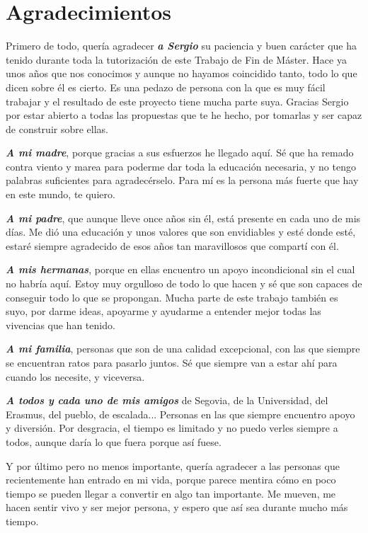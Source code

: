 \cleardoublepage
{}
\chapter*{Agradecimientos}

Primero de todo, quería agradecer \textbf{\textit{a Sergio}} su paciencia y buen carácter que ha tenido durante toda la tutorización de este Trabajo de Fin de Máster. Hace ya unos años que nos conocimos y aunque no hayamos coincidido tanto, todo lo que dicen sobre él es cierto. Es una pedazo de persona con la que es muy fácil trabajar y el resultado de este proyecto tiene mucha parte suya. Gracias Sergio por estar abierto a todas las propuestas que te he hecho, por tomarlas y ser capaz de construir sobre ellas.

\textbf{\textit{A mi madre}}, porque gracias a sus esfuerzos he llegado aquí. Sé que ha remado contra viento y marea para poderme dar toda la educación necesaria, y no tengo palabras suficientes para agradecérselo. Para mí es la persona más fuerte que hay en este mundo, te quiero.

\textbf{\textit{A mi padre}}, que aunque lleve once años sin él, está presente en cada uno de mis días. Me dió una educación y unos valores que son envidiables y esté donde esté, estaré siempre agradecido de esos años tan maravillosos que compartí con él.

\textbf{\textit{A mis hermanas}}, porque en ellas encuentro un apoyo incondicional sin el cual no habría aquí. Estoy muy orgulloso de todo lo que hacen y sé que son capaces de conseguir todo lo que se propongan. Mucha parte de este trabajo también es suyo, por darme ideas, apoyarme y ayudarme a entender mejor todas las vivencias que han tenido.

\textbf{\textit{A mi familia}}, personas que son de una calidad excepcional, con las que siempre se encuentran ratos para pasarlo juntos. Sé que siempre van a estar ahí para cuando los necesite, y viceversa.

\textbf{\textit{A todos y cada uno de mis amigos}} de Segovia, de la Universidad, del Erasmus, del pueblo, de escalada... Personas en las que siempre encuentro apoyo y diversión. Por desgracia, el tiempo es limitado y no puedo verles siempre a todos, aunque daría lo que fuera porque así fuese. 

Y por último pero no menos importante, quería agradecer a las personas que recientemente han entrado en mi vida, porque parece mentira cómo en poco tiempo se pueden llegar a convertir en algo tan importante. Me mueven, me hacen sentir vivo y ser mejor persona, y espero que así sea durante mucho más tiempo.
